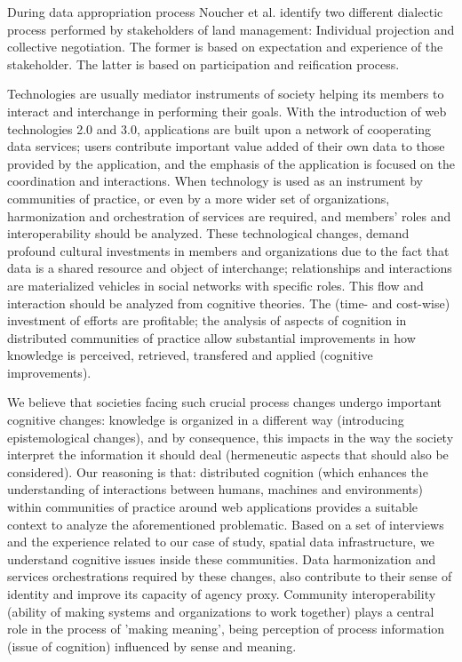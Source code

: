 \documentclass[10pt,twocolumn,ieeetran]{article}
\begin{document}
During data appropriation process Noucher et al. \cite{Noucher1} identify two different dialectic process  performed by stakeholders of land management: Individual projection and collective negotiation.
The former is based on expectation and experience of the stakeholder. The latter is based on participation
and reification process. 



Technologies are usually mediator instruments of society helping its members to interact and interchange in performing their goals. With the introduction of web technologies 2.0 and 3.0, applications are built  upon a network of cooperating data services; users contribute important value added of their own data to those provided by the application, and the emphasis of the application is focused on the coordination and interactions. 
When technology is used as an instrument by communities of practice, or even by a more wider set of organizations, harmonization and orchestration of services are required, and members' roles and interoperability should be analyzed. 
These technological changes, demand profound cultural investments in members and organizations due to the fact that data is a shared resource and object of interchange; relationships and interactions are materialized vehicles in social networks with specific roles. This flow and interaction should be analyzed from cognitive theories. The (time- and cost-wise) investment of efforts are profitable; the analysis of aspects of cognition in distributed communities of practice allow substantial improvements in how knowledge is perceived, retrieved, transfered and applied (cognitive improvements).


We believe that societies facing such crucial process changes undergo important cognitive changes: knowledge is organized in a different way (introducing epistemological changes), and by consequence, this impacts in the way the society interpret the information it should deal (hermeneutic aspects that should also be considered). Our reasoning is that: distributed cognition (which enhances the understanding of interactions between humans, machines and environments) within communities of practice around web applications provides a suitable context to analyze the aforementioned problematic. Based on a set of interviews and the experience related to our case of study, spatial data infrastructure, we understand cognitive issues inside these communities. Data harmonization and services orchestrations required by these changes, also contribute to their sense of identity and improve its capacity of agency proxy. Community interoperability (ability of making systems and organizations to work together) plays a central role in the process of 'making meaning',
being perception of process information (issue of cognition) influenced by sense and meaning. 
\end{document}
